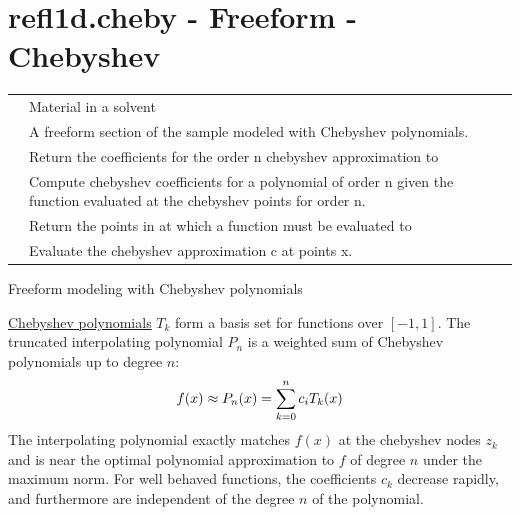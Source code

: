 \documentclass[letterpaper,10pt,english]{sphinxmanual}
\begin{document}
\section{refl1d.cheby - Freeform - Chebyshev}
\label{api/cheby:refl1d-cheby-freeform-chebyshev}\label{api/cheby::doc}
\begin{tabulary}{\linewidth}{LL}
\hline

{\hyperref[api/cheby:refl1d.cheby.ChebyVF]{}}
 & 
Material in a solvent
\\

{\hyperref[api/cheby:refl1d.cheby.FreeformCheby]{}}
 & 
A freeform section of the sample modeled with Chebyshev polynomials.
\\

{\hyperref[api/cheby:refl1d.cheby.cheby_approx]{}}
 & 
Return the coefficients for the order n chebyshev approximation to
\\

{\hyperref[api/cheby:refl1d.cheby.cheby_coeff]{}}
 & 
Compute chebyshev coefficients for a polynomial of order n given the function evaluated at the chebyshev points for order n.
\\

{\hyperref[api/cheby:refl1d.cheby.cheby_points]{}}
 & 
Return the points in at which a function must be evaluated to
\\

{\hyperref[api/cheby:refl1d.cheby.cheby_val]{}}
 & 
Evaluate the chebyshev approximation c at points x.
\\
\hline
\end{tabulary}

\label{api/cheby:module-refl1d.cheby}
Freeform modeling with Chebyshev polynomials

\href{http://en.wikipedia.org/wiki/Chebyshev\_polynomials}{Chebyshev polynomials}
$T_k$ form a basis set for functions over $[-1,1]$.  The truncated
interpolating polynomial $P_n$ is a weighted sum of Chebyshev polynomials
up to degree $n$:
\begin{gather}
\begin{split}f(x) \approx P_n(x) = \sum_{k=0}^n c_i T_k(x)\end{split}\notag
\end{gather}
The interpolating polynomial exactly matches $f(x)$ at the chebyshev
nodes $z_k$ and is near the optimal polynomial approximation to $f$
of degree $n$ under the maximum norm.  For well behaved functions,
the coefficients $c_k$ decrease rapidly, and furthermore are independent
of the degree $n$ of the polynomial.
\end{document}
